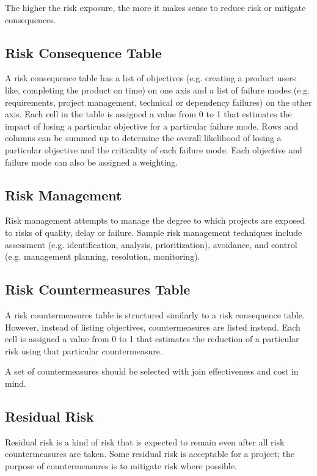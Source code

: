 \documentclass[12pt,titlepage]{article}
\begin{document}
      The higher the risk exposure, the more it makes sense to reduce risk or mitigate consequences.

    \subsection{Risk Consequence Table}
      A risk consequence table has a list of objectives (e.g. creating a product users like, completing the product on time) on one axis
      and a list of failure modes (e.g. requirements, project management, technical or dependency failures) on the other axis. Each cell in the
      table is assigned a value from 0 to 1 that estimates the impact of losing a particular objective for a particular failure mode. Rows and
      columns can be summed up to determine the overall likelihood of losing a particular objective and the criticality of each failure mode. Each
      objective and failure mode can also be assigned a weighting.

    \subsection{Risk Management}
      Risk management attempts to manage the degree to which projects are exposed to risks of quality, delay or failure. Sample risk management
      techniques include assessment (e.g. identification, analysis, prioritization), avoidance, and control (e.g. management planning, resolution,
      monitoring).

    \subsection{Risk Countermeasures Table}
      A risk countermeasures table is structured similarly to a risk consequence table. However, instead of listing objectives, countermeasures are
      listed instead. Each cell is assigned a value from 0 to 1 that estimates the reduction of a particular risk using that particular countermeasure.

      A set of countermeasures should be selected with join effectiveness and cost in mind.

    \subsection{Residual Risk}
      Residual risk is a kind of risk that is expected to remain even after all risk countermeasures are taken. Some residual risk is acceptable for a
      project; the purpose of countermeasures is to mitigate risk where possible.
\end{document}
